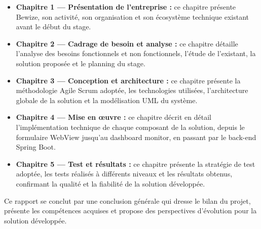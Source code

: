 \begin{itemize}
    \item \textbf{Chapitre 1 — Présentation de l'entreprise :} 
    ce chapitre présente Bewize, son activité, son organisation 
    et son écosystème technique existant avant le début du stage.
    
    \item \textbf{Chapitre 2 — Cadrage de besoin et analyse :} 
    ce chapitre détaille l'analyse des besoins fonctionnels et 
    non fonctionnels, l'étude de l'existant, la solution proposée 
    et le planning du stage.
    
    \item \textbf{Chapitre 3 — Conception et architecture :} 
    ce chapitre présente la méthodologie Agile Scrum adoptée, 
    les technologies utilisées, l'architecture globale de la 
    solution et la modélisation UML du système.
    
    \item \textbf{Chapitre 4 — Mise en œuvre :} ce chapitre 
    décrit en détail l'implémentation technique de chaque composant 
    de la solution, depuis le formulaire WebView jusqu'au dashboard 
    monitor, en passant par le back-end Spring Boot.
    
    \item \textbf{Chapitre 5 — Test et résultats :} ce chapitre 
    présente la stratégie de test adoptée, les tests réalisés 
    à différents niveaux et les résultats obtenus, confirmant 
    la qualité et la fiabilité de la solution développée.
\end{itemize}

Ce rapport se conclut par une conclusion générale qui dresse 
le bilan du projet, présente les compétences acquises et propose 
des perspectives d'évolution pour la solution développée.